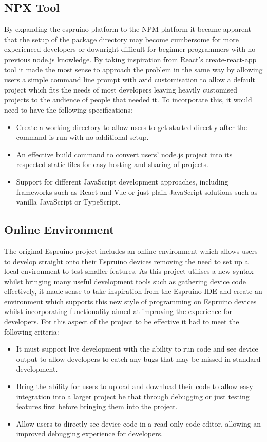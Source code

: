 \documentclass{l4proj}
\begin{document}
\subsection{NPX Tool}
\text By expanding the espruino platform to the NPM platform it became apparent that the setup of the package directory may become cumbersome for more experienced developers or downright difficult for beginner programmers with no previous node.js knowledge. By taking inspiration from React's \href{https://reactjs.org/docs/create-a-new-react-app.html}{create-react-app} tool it made the most sense to approach the problem in the same way by allowing users a simple command line prompt with avid customisation to allow a default project which fits the needs of most developers leaving heavily customised projects to the audience of people that needed it. To incorporate this, it would need to have the following specifications:
\\
\begin{itemize}
    \item Create a working directory to allow users to get started directly after the command is run with no additional setup.
    \item An effective build command to convert users' node.js project into its respected static files for easy hosting and sharing of projects.
    \item Support for different JavaScript development approaches, including frameworks such as React and Vue or just plain JavaScript solutions such as vanilla JavaScript or TypeScript.
\end{itemize}

\subsection{Online Environment}
\text The original Espruino project includes an online environment which allows users to develop straight onto their Espruino devices removing the need to set up a local environment to test smaller features. As this project utilises a new syntax whilst bringing many useful development tools such as gathering device code effectively, it made sense to take inspiration from the Espruino IDE and create an environment which supports this new style of programming on Espruino devices whilst incorporating functionality aimed at improving the experience for developers. For this aspect of the project to be effective it had to meet the following criteria:
\\
\begin{itemize}
    \item It must support live development with the ability to run code and see device output to allow developers to catch any bugs that may be missed in standard development.
    \item Bring the ability for users to upload and download their code to allow easy integration into a larger project be that through debugging or just testing features first before bringing them into the project.
    \item Allow users to directly see device code in a read-only code editor, allowing an improved debugging experience for developers.
\end{itemize}
\end{document}
